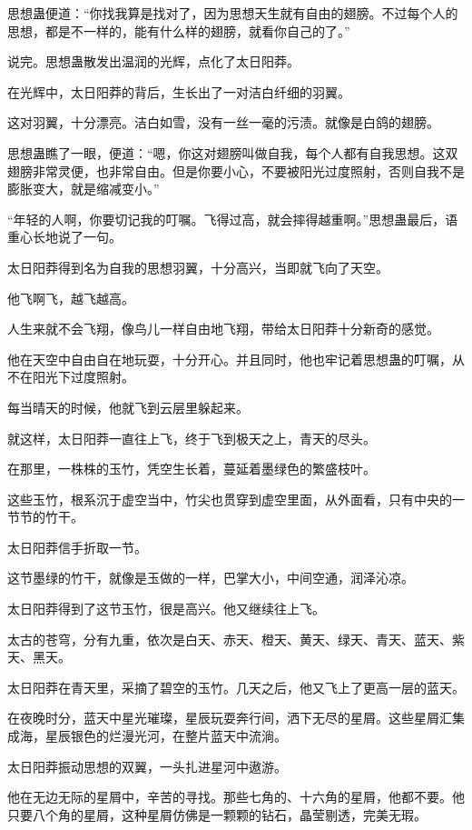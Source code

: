 \begin{this_body}
思想蛊便道：“你找我算是找对了，因为思想天生就有自由的翅膀。不过每个人的思想，都是不一样的，能有什么样的翅膀，就看你自己的了。”

说完。思想蛊散发出温润的光辉，点化了太日阳莽。

在光辉中，太日阳莽的背后，生长出了一对洁白纤细的羽翼。

这对羽翼，十分漂亮。洁白如雪，没有一丝一毫的污渍。就像是白鸽的翅膀。

思想蛊瞧了一眼，便道：“嗯，你这对翅膀叫做自我，每个人都有自我思想。这双翅膀非常灵便，也非常自由。但是你要小心，不要被阳光过度照射，否则自我不是膨胀变大，就是缩减变小。”

“年轻的人啊，你要切记我的叮嘱。飞得过高，就会摔得越重啊。”思想蛊最后，语重心长地说了一句。

太日阳莽得到名为自我的思想羽翼，十分高兴，当即就飞向了天空。

他飞啊飞，越飞越高。

人生来就不会飞翔，像鸟儿一样自由地飞翔，带给太日阳莽十分新奇的感觉。

他在天空中自由自在地玩耍，十分开心。并且同时，他也牢记着思想蛊的叮嘱，从不在阳光下过度照射。

每当晴天的时候，他就飞到云层里躲起来。

就这样，太日阳莽一直往上飞，终于飞到极天之上，青天的尽头。

在那里，一株株的玉竹，凭空生长着，蔓延着墨绿色的繁盛枝叶。

这些玉竹，根系沉于虚空当中，竹尖也贯穿到虚空里面，从外面看，只有中央的一节节的竹干。

太日阳莽信手折取一节。

这节墨绿的竹干，就像是玉做的一样，巴掌大小，中间空通，润泽沁凉。

太日阳莽得到了这节玉竹，很是高兴。他又继续往上飞。

太古的苍穹，分有九重，依次是白天、赤天、橙天、黄天、绿天、青天、蓝天、紫天、黑天。

太日阳莽在青天里，采摘了碧空的玉竹。几天之后，他又飞上了更高一层的蓝天。

在夜晚时分，蓝天中星光璀璨，星辰玩耍奔行间，洒下无尽的星屑。这些星屑汇集成海，星辰银色的烂漫光河，在整片蓝天中流淌。

太日阳莽振动思想的双翼，一头扎进星河中遨游。

他在无边无际的星屑中，辛苦的寻找。那些七角的、十六角的星屑，他都不要。他只要八个角的星屑，这种星屑仿佛是一颗颗的钻石，晶莹剔透，完美无瑕。


\end{this_body}
